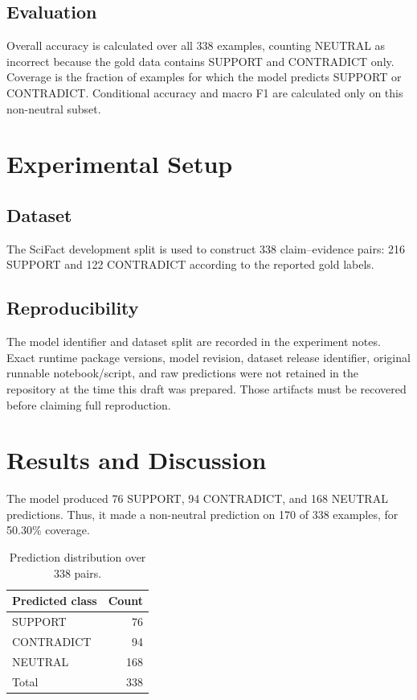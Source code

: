 \documentclass[conference]{IEEEtran}
\begin{document}
\subsection{Evaluation}
Overall accuracy is calculated over all 338 examples, counting NEUTRAL as incorrect because the gold data contains SUPPORT and CONTRADICT only. Coverage is the fraction of examples for which the model predicts SUPPORT or CONTRADICT. Conditional accuracy and macro F1 are calculated only on this non-neutral subset.

\section{Experimental Setup}
\subsection{Dataset}
The SciFact development split is used to construct 338 claim--evidence pairs: 216 SUPPORT and 122 CONTRADICT according to the reported gold labels.

\subsection{Reproducibility}
The model identifier and dataset split are recorded in the experiment notes. Exact runtime package versions, model revision, dataset release identifier, original runnable notebook/script, and raw predictions were not retained in the repository at the time this draft was prepared. Those artifacts must be recovered before claiming full reproduction.

\section{Results and Discussion}
The model produced 76 SUPPORT, 94 CONTRADICT, and 168 NEUTRAL predictions. Thus, it made a non-neutral prediction on 170 of 338 examples, for 50.30\% coverage.

\begin{table}[t]
\centering
\caption{Prediction distribution over 338 pairs.}
\begin{tabular}{lr}
\toprule
Predicted class & Count\\
\midrule
SUPPORT & 76\\
CONTRADICT & 94\\
NEUTRAL & 168\\
\midrule
Total & 338\\
\bottomrule
\end{tabular}
\end{table}
\end{document}
